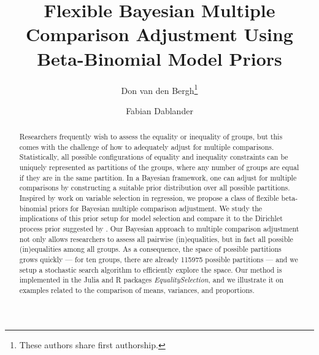 \documentclass[11pt,a4paper]{article}
\date{}
\title{Flexible Bayesian Multiple Comparison Adjustment Using Beta-Binomial Model Priors}
\author{Don van den Bergh\thanks{These authors share first authorship.} }
\author{Fabian Dablander\samethanks[1]}
\affil{Department of Psychological Methods, University of Amsterdam}
\theoremstyle{definition} %
\theoremstyle{case}
\begin{document}
\maketitle

\begin{abstract}
\noindent Researchers frequently wish to assess the equality or inequality of groups, but this comes with the challenge of how to adequately adjust for multiple comparisons. Statistically, all possible configurations of equality and inequality constraints can be uniquely represented as partitions of the groups, where any number of groups are equal if they are in the same partition. In a Bayesian framework, one can adjust for multiple comparisons by constructing a suitable prior distribution over all possible partitions. Inspired by work on variable selection in regression, we propose a class of flexible beta-binomial priors for Bayesian multiple comparison adjustment. We study the implications of this prior setup for model selection and compare it to the Dirichlet process prior suggested by \textcite{gopalan1998bayesian}. Our Bayesian approach to multiple comparison adjustment not only allows researchers to assess all pairwise (in)equalities, but in fact all possible (in)equalities among all groups. As a consequence, the space of possible partitions grows quickly --- for ten groups, there are already 115975 possible partitions --- and we setup a stochastic search algorithm to efficiently explore the space. Our method is implemented in the Julia and R packages \textit{EqualitySelection}, and we illustrate it on examples related to the comparison of means, variances, and proportions.
\end{abstract}
\end{document}
